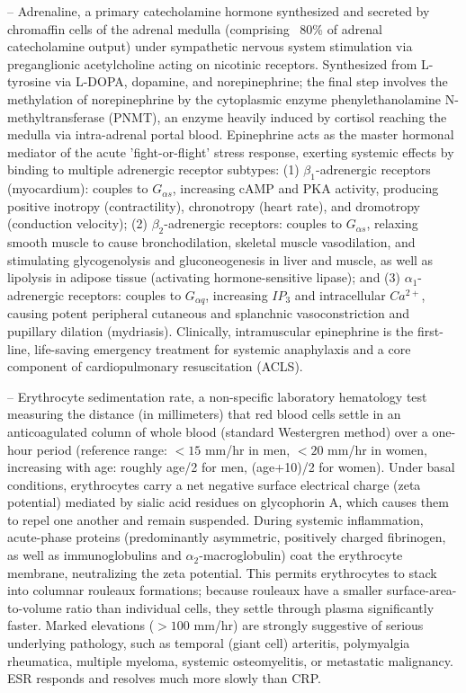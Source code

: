 -- Adrenaline, a primary catecholamine hormone synthesized and secreted by chromaffin cells of the adrenal medulla (comprising ~80\% of adrenal catecholamine output) under sympathetic nervous system stimulation via preganglionic acetylcholine acting on nicotinic receptors. Synthesized from L-tyrosine via L-DOPA, dopamine, and norepinephrine; the final step involves the methylation of norepinephrine by the cytoplasmic enzyme phenylethanolamine N-methyltransferase (PNMT), an enzyme heavily induced by cortisol reaching the medulla via intra-adrenal portal blood. Epinephrine acts as the master hormonal mediator of the acute 'fight-or-flight' stress response, exerting systemic effects by binding to multiple adrenergic receptor subtypes: (1) $\beta_1$-adrenergic receptors (myocardium): couples to $G_{\alpha s}$, increasing cAMP and PKA activity, producing positive inotropy (contractility), chronotropy (heart rate), and dromotropy (conduction velocity); (2) $\beta_2$-adrenergic receptors: couples to $G_{\alpha s}$, relaxing smooth muscle to cause bronchodilation, skeletal muscle vasodilation, and stimulating glycogenolysis and gluconeogenesis in liver and muscle, as well as lipolysis in adipose tissue (activating hormone-sensitive lipase); and (3) $\alpha_1$-adrenergic receptors: couples to $G_{\alpha q}$, increasing $IP_3$ and intracellular $Ca^{2+}$, causing potent peripheral cutaneous and splanchnic vasoconstriction and pupillary dilation (mydriasis). Clinically, intramuscular epinephrine is the first-line, life-saving emergency treatment for systemic anaphylaxis and a core component of cardiopulmonary resuscitation (ACLS).

-- Erythrocyte sedimentation rate, a non-specific laboratory hematology test measuring the distance (in millimeters) that red blood cells settle in an anticoagulated column of whole blood (standard Westergren method) over a one-hour period (reference range: $<15$ mm/hr in men, $<20$ mm/hr in women, increasing with age: roughly age/2 for men, (age+10)/2 for women). Under basal conditions, erythrocytes carry a net negative surface electrical charge (zeta potential) mediated by sialic acid residues on glycophorin A, which causes them to repel one another and remain suspended. During systemic inflammation, acute-phase proteins (predominantly asymmetric, positively charged fibrinogen, as well as immunoglobulins and $\alpha_2$-macroglobulin) coat the erythrocyte membrane, neutralizing the zeta potential. This permits erythrocytes to stack into columnar rouleaux formations; because rouleaux have a smaller surface-area-to-volume ratio than individual cells, they settle through plasma significantly faster. Marked elevations ($>100$ mm/hr) are strongly suggestive of serious underlying pathology, such as temporal (giant cell) arteritis, polymyalgia rheumatica, multiple myeloma, systemic osteomyelitis, or metastatic malignancy. ESR responds and resolves much more slowly than CRP.

